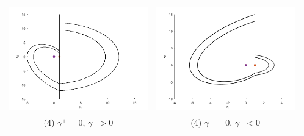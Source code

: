 \begin{table}[H]
\begin{tabular}{cc}
\includegraphics[width=6cm]{1_4_1}
&
\includegraphics[width=6cm]{1_4_1_lesser}\\
\small(4) $\gamma^+=0$, $\gamma^->0$&\small(4) $\gamma^+=0$, $\gamma^-<0$
\end{tabular}
\end{table}
